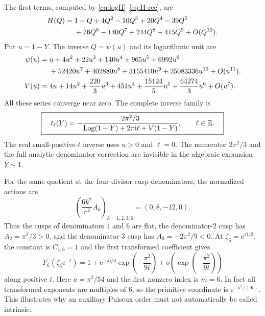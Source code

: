 \documentclass[11pt,a4paper]{article}
\numberwithin{equation}{section}
\theoremstyle{definition}\newtheorem{definition}[theorem]{Definition}
\theoremstyle{remark}\newtheorem{remark}[theorem]{Remark}
\newcommand{\ii}{\mathrm i}\newcommand{\e}{\mathrm e}
\newcommand{\Log}{\operatorname{Log}}\newcommand{\Li}{\operatorname{Li}}
\begin{document}
The first terms, computed by \eqref{eq:logH}--\eqref{eq:H-rec}, are
\begin{align}
 H(Q)={}&1-Q+4Q^2-10Q^3+20Q^4-39Q^5\notag\\
       &+76Q^6-140Q^7+244Q^8-415Q^9+O(Q^{10}).
 \label{eq:H6-series}
\end{align}
Put $u=1-Y$. The inverse $Q=\psi(u)$ and its logarithmic unit are
\begin{align}
 \psi(u)={}&u+4u^2+22u^3+140u^4+965u^5+6992u^6\notag\\
 &+52420u^7+402880u^8+3155410u^9+25083336u^{10}+O(u^{11}),
 \label{eq:psi6}\\
 V(u)={}&4u+14u^2+\frac{220}{3}u^3+451u^4
        +\frac{15124}{5}u^5+\frac{64274}{3}u^6+O(u^7).
 \label{eq:V6}
\end{align}
All these series converge near zero. The complete inverse family is
\begin{equation}\label{eq:t6}
 \boxed{\quad t_\ell(Y)=
 -\frac{2\pi^2/3}{\Log(1-Y)+2\pi\ii\ell+V(1-Y)},
 \qquad \ell\in\Z.\quad}
\end{equation}
The real small-positive-$t$ inverse uses $u>0$ and $\ell=0$.
The numerator $2\pi^2/3$ and the full analytic denominator correction
are invisible in the algebraic expansion $Y\sim1$.

For the same quotient at the four divisor cusp denominators, the
normalized actions are
\begin{equation}\label{eq:example-actions}
 \left(\frac{6k^2}{\pi^2}A_k\right)_{k=1,2,3,6}=(0,8,-12,0).
\end{equation}
Thus the cusps of denominators $1$ and $6$ are flat, the denominator-$2$
cusp has $A_2=\pi^2/3>0$, and the denominator-$3$ cusp has
$A_3=-2\pi^2/9<0$. At $\zeta_6=\e^{\pi\ii/3}$, the constant is
$C_{1,6}=1$ and the first transformed coefficient gives
\begin{equation}\label{eq:sixth-cusp}
 F_6(\zeta_6\e^{-t})
 =1+\e^{-\pi\ii/3}\exp\left(-\frac{\pi^2}{9t}\right)
   +o\left(\exp\left(-\frac{\pi^2}{9t}\right)\right)
\end{equation}
along positive $t$. Here $a=\pi^2/54$ and the first nonzero index is
$m=6$. In fact all transformed exponents are multiples of $6$, so the
primitive coordinate is $\e^{-\pi^2/(9t)}$. This illustrates why an
auxiliary Puiseux order must not automatically be called intrinsic.
\end{document}
